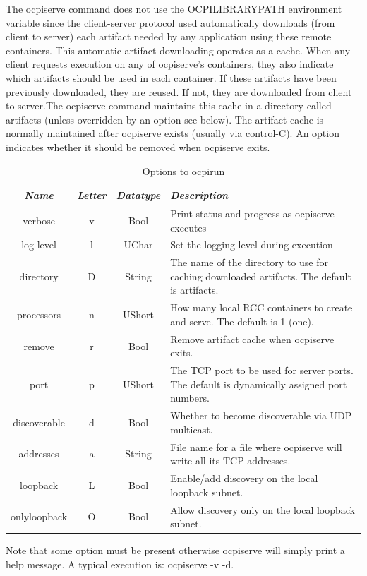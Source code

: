 \documentclass[10pt, a4paper, oneside]{article}
\renewcommand*{\arraystretch}{2.5}%
\renewcommand\_{\textunderscore\allowbreak} %
\begin{document}
The ocpiserve command does not use the {OCPI\_LIBRARY\_PATH} environment variable since the client-server protocol used automatically downloads (from client to server) each artifact needed by any application using these remote containers.  This automatic artifact downloading operates as a cache. When any client requests execution on any of ocpiserve's containers, they also indicate which artifacts should be used in each container. If these artifacts have been previously downloaded, they are reused.  If not, they are downloaded from client to server.The ocpiserve command maintains this cache in a directory called artifacts (unless overridden by an option-see below). The artifact cache is normally maintained after ocpiserve exists (usually via control-C).  An option indicates whether it should be removed when ocpiserve exits.\\
\newpage
\begin{table}[h!]
\caption{Options to ocpirun}
\renewcommand*{\arraystretch}{2.5}
\begin{tabular}[c] { |c|c|c|p{11cm}|}
\hline \emph{Name} & \emph{Letter} & \emph{Datatype} & \emph{Description}\\
\hline
verbose &	v &	Bool &	Print status and progress as ocpiserve executes\\
\hline 
log-level & l &	UChar &	Set the logging level during execution\\
\hline
 directory &	D	& String &	The name of the directory to use for caching downloaded artifacts.  The default is artifacts.\\
\hline 
processors &	n &	UShort & How many local RCC containers to create and serve.  The default is 1 (one).\\
\hline 
remove &	r & Bool & Remove artifact cache when ocpiserve exits.\\
\hline 
port	& p	& UShort &	The TCP port to be used for server ports.  The default is dynamically assigned port numbers.\\
\hline 
discoverable	& d	& Bool & Whether to become discoverable via UDP multicast.\\
\hline 
addresses &	a &	String &	File name for a file where ocpiserve will write all its TCP addresses.\\
\hline
loopback &	L	& Bool & Enable/add discovery on the local loopback subnet.\\
\hline 
onlyloopback &	O	& Bool	& Allow discovery only on the local loopback subnet.\\
\hline
\end{tabular}
\end{table}
Note that some option must be present otherwise ocpiserve will simply print a help message.  A typical execution is: ocpiserve -v -d.
\end{document}
